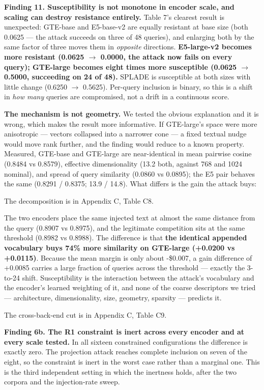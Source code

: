 \documentclass[authoryear,review,3p,times]{elsarticle}
\newcounter{none}
\begin{document}
\textbf{Finding 11. Susceptibility is not monotone in encoder scale, and scaling can destroy resistance entirely.} Table 7's clearest result is unexpected: GTE-base and E5-base-v2 are equally resistant at base size (both 0.0625 --- the attack succeeds on three of 48 queries), and enlarging both by the same factor of three moves them in \emph{opposite} directions. \textbf{E5-large-v2 becomes more resistant (0.0625 \(\rightarrow\) 0.0000, the attack now fails on every query); GTE-large becomes eight times more susceptible (0.0625 \(\rightarrow\) 0.5000, succeeding on 24 of 48).} SPLADE is susceptible at both sizes with little change (0.6250 \(\rightarrow\) 0.5625). Per-query inclusion is binary, so this is a shift in \emph{how many} queries are compromised, not a drift in a continuous score.

\textbf{The mechanism is not geometry.} We tested the obvious explanation and it is wrong, which makes the result more informative. If GTE-large's space were more anisotropic --- vectors collapsed into a narrower cone --- a fixed textual nudge would move rank further, and the finding would reduce to a known property. Measured, GTE-base and GTE-large are near-identical in mean pairwise cosine (0.8484 vs 0.8579), effective dimensionality (13.2 both, against 768 and 1024 nominal), and spread of query similarity (0.0860 vs 0.0895); the E5 pair behaves the same (0.8291 / 0.8375; 13.9 / 14.8). What differs is the gain the attack buys:

The decomposition is in Appendix C, Table C8.


The two encoders place the same injected text at almost the same distance from the query (0.8907 vs 0.8975), and the legitimate competition sits at the same threshold (0.8982 vs 0.8988). The difference is that \textbf{the identical appended vocabulary buys 74\% more similarity on GTE-large (+0.0200 vs +0.0115)}. Because the mean margin is only about -\$0.007, a gain difference of +0.0085 carries a large fraction of queries across the threshold --- exactly the 3-to-24 shift. Susceptibility is the interaction between the attack's vocabulary and the encoder's learned weighting of it, and none of the coarse descriptors we tried --- architecture, dimensionality, size, geometry, sparsity --- predicts it.

The cross-back-end cut is in Appendix C, Table C9.


\textbf{Finding 6b. The R1 constraint is inert across every encoder and at every scale tested.} In all sixteen constrained configurations the difference is exactly zero. The projection attack reaches complete inclusion on seven of the eight, so the constraint is inert in the worst case rather than a marginal one. This is the third independent setting in which the inertness holds, after the two corpora and the injection-rate sweep.
\end{document}
